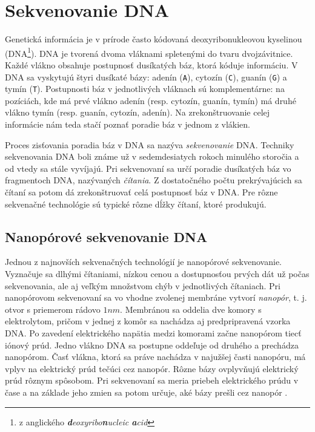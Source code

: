 \chapter{Sekvenovanie DNA}

\label{kap:sekvenovanie}

Genetická informácia je v prírode často kódovaná deoxyribonukleovou kyselinou (DNA\footnote{z anglického 
\emph{\textbf{d}eoxyribo\textbf{n}ucleic \textbf{a}cid}}). DNA je tvorená dvoma vláknami spletenými
do tvaru dvojzávitnice. Každé vlákno obsahuje postupnosť dusíkatých báz, ktorá kóduje informáciu. V DNA 
sa 
vyskytujú štyri
dusíkaté bázy: adenín (\texttt{A}), cytozín (\texttt{C}), guanín (\texttt{G}) a tymín (\texttt{T}). Postupnosti báz v jednotlivých vláknach 
sú 
komplementárne: na pozíciách, kde má prvé vlákno adenín 
(resp. cytozín, guanín, tymín) má druhé vlákno tymín (resp. guanín, cytozín, adenín). Na 
zrekonštruovanie 
celej informácie nám teda stačí poznať poradie báz v jednom z vlákien.

Proces zisťovania poradia báz v DNA sa nazýva \emph{sekvenovanie} DNA. Techniky sekvenovania DNA
boli známe už v sedemdesiatych rokoch minulého storočia a od vtedy sa stále vyvíjajú. Pri sekvenovaní
sa určí poradie dusíkatých báz vo fragmentoch DNA, nazývaných \emph{čítania}. Z dostatočného počtu 
prekrývajúcich sa čítaní sa potom dá zrekonštruovať celá postupnosť báz v DNA. Pre rôzne sekvenačné 
technológie sú typické rôzne dĺžky čítaní, ktoré produkujú.

\section{Nanopórové sekvenovanie DNA}

Jednou z najnovších sekvenačných technológií je nanopórové sekvenovanie. Vyznačuje sa dlhými čítaniami,
nízkou cenou a dostupnosťou prvých dát už počas sekvenovania, ale aj veľkým množstvom chýb v 
jednotlivých čítaniach. Pri nanopórovom sekvenovaní sa vo vhodne zvolenej membráne vytvorí 
\emph{nanopór}, t. j. otvor s priemerom rádovo $1 \si{nm}$. Membránou sa oddelia dve komory s 
elektrolytom, pričom v jednej z komôr sa nachádza aj predpripravená vzorka DNA.
Po zavedení elektrického napätia medzi komorami začne nanopórom tiecť iónový prúd. Jedno vlákno DNA sa postupne oddeľuje od druhého a prechádza nanopórom. Časť vlákna, 
ktorá sa práve nachádza v najužšej časti nanopóru, má vplyv na elektrický prúd tečúci cez nanopór. Rôzne 
bázy ovplyvňujú elektrický prúd rôznym spôsobom. Pri sekvenovaní sa meria priebeh elektrického prúdu v 
čase a na základe jeho zmien sa potom určuje, aké bázy prešli cez nanopór \cite{Branton2008}.

